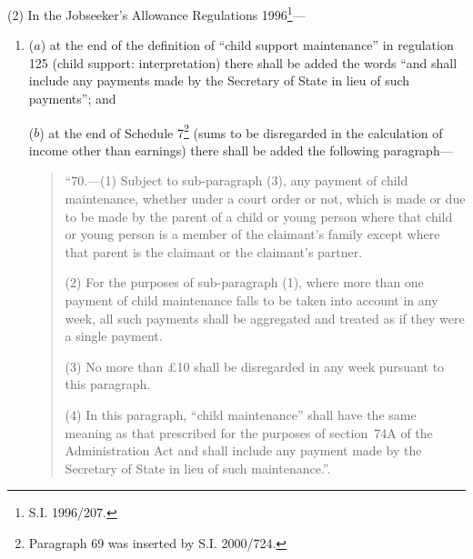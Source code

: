 \documentclass[12pt,a4paper]{article}
\begin{document}
(2) In the Jobseeker’s Allowance Regulations 1996\footnote{\frenchspacing S.I. 1996/207.}—
\begin{enumerate}\item[]
($a$) at the end of the definition of “child support maintenance” in regulation 125 (child support: interpretation) there shall be added the words “and shall include any payments made by the Secretary of State in lieu of such payments”; and

($b$) at the end of Schedule 7\footnote{\frenchspacing Paragraph 69 was inserted by S.I. 2000/724.} (sums to be disregarded in the calculation of income other than earnings) there shall be added the following paragraph—
\begin{quotation}
“70.---(1)  Subject to sub-paragraph (3), any payment of child maintenance, whether under a court order or not, which is made or due to be made by the parent of a child or young person where that child or young person is a member of the claimant’s family except where that parent is the claimant or the claimant’s partner.

(2) For the purposes of sub-paragraph (1), where more than one payment of child maintenance falls to be taken into account in any week, all such payments shall be aggregated and treated as if they were a single payment.

(3) No more than £10 shall be disregarded in any week pursuant to this paragraph.

(4) In this paragraph, “child maintenance” shall have the same meaning as that prescribed for the purposes of section~74A of the Administration Act and shall include any payment made by the Secretary of State in lieu of such maintenance.”.
\end{quotation}
\end{enumerate}


%
\end{document}
